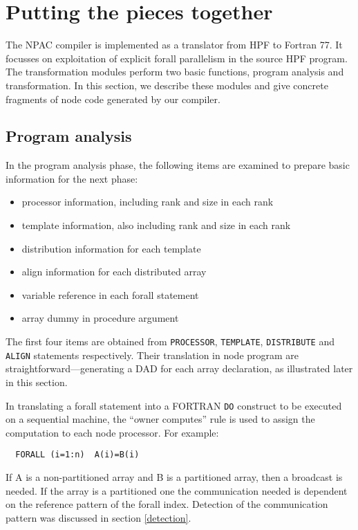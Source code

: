 \section{Putting the pieces together\label{node}}

The NPAC compiler is implemented as a translator from HPF to Fortran
77.  It focusses on exploitation of explicit forall parallelism in the
source HPF program.  The transformation modules perform two basic
functions, program analysis and transformation. In this section, we
describe these modules and give concrete fragments of node code
generated by our compiler.

\subsection{Program analysis}

In the program analysis phase, the following items are examined to
prepare basic information for the next phase:
\begin{itemize}
\item processor information, including rank and size in each rank
\item template information, also including rank and size in each rank
\item distribution information for each template
\item align information for each distributed array
\item variable reference in each forall statement
\item array dummy in procedure argument
\end{itemize}
The first four items are obtained from {\tt PROCESSOR}, {\tt TEMPLATE},
{\tt DISTRIBUTE}
and {\tt ALIGN} statements respectively.  Their translation in
node program are straight\-forward---generating a DAD for each
array declaration, as illustrated later in this section.

In translating a forall statement into a FORTRAN {\tt DO} construct to be
executed on a sequential machine, the ``owner computes'' rule is used to
assign the computation to each node processor.  For example:
\begin{verbatim}
  FORALL (i=1:n)  A(i)=B(i)
\end{verbatim}
If A is a non-partitioned array and B is a partitioned array, then a
broadcast is needed.  If the array is a partitioned one the
communication needed is dependent on the reference pattern of the
forall index.
Detection of the communication pattern was discussed in section
\ref{detection}.


